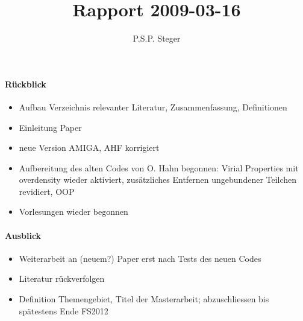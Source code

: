 \documentclass[10pt]{report}
\begin{document}
%
\begin{titlepage}
 \title{Rapport 2009-03-16}
 \author{P.S.P. Steger}
 \maketitle
\end{titlepage}
%
%
\paragraph{R\"uckblick}
%
\begin{itemize}
\item Aufbau Verzeichnis relevanter Literatur, Zusammenfassung, Definitionen
\item Einleitung Paper
\item neue Version AMIGA, AHF korrigiert
\item Aufbereitung des alten Codes von O. Hahn begonnen: Virial Properties mit overdensity wieder aktiviert, zus\"atzliches Entfernen ungebundener Teilchen revidiert, OOP
\item Vorlesungen wieder begonnen
\end{itemize}
%
\paragraph{Ausblick}
%
\begin{itemize}
\item Weiterarbeit an (neuem?) Paper erst nach Tests des neuen Codes
\item Literatur r\"uckverfolgen
\item Definition Themengebiet, Titel der Masterarbeit; abzuschliessen bis sp\"atestens Ende FS2012
\end{itemize}
%
%
\end{document}
